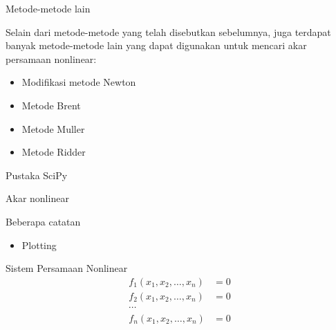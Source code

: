 


\begin{frame}{Metode-metode lain}

Selain dari metode-metode yang telah disebutkan sebelumnya, juga
terdapat banyak metode-metode lain yang dapat digunakan untuk mencari
akar persamaan nonlinear:
\begin{itemize}\tightlist
\item Modifikasi metode Newton
\item Metode Brent
\item Metode Muller
\item Metode Ridder
\end{itemize}

\end{frame}


\begin{frame}{Pustaka SciPy}

Akar nonlinear

\end{frame}



\begin{frame}{Beberapa catatan}
\begin{itemize}
\item Plotting
\end{itemize}
\end{frame}




\begin{frame}{Sistem Persamaan Nonlinear}
\begin{align*}
f_{1} (x_1, x_2, \ldots, x_n) & = 0 \\
f_{2} (x_1, x_2, \ldots, x_n) & = 0 \\
\cdots \\
f_{n} (x_1, x_2, \ldots, x_n) & = 0
\end{align*}
\end{frame}


